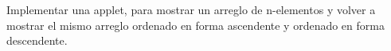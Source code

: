 Implementar una applet, para mostrar un arreglo de n-elementos y volver a mostrar el mismo arreglo ordenado en forma ascendente y ordenado en forma descendente.